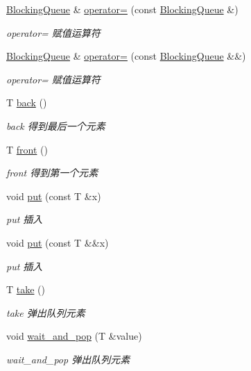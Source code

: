 \begin{DoxyCompactItemize}
\hyperlink{classBlockingQueue}{Blocking\+Queue} \& \hyperlink{classBlockingQueue_aaee07bb9044a01b4cb0af75748795325}{operator=} (const \hyperlink{classBlockingQueue}{Blocking\+Queue} \&)
\begin{DoxyCompactList}\small\item\em operator= 赋值运算符 \end{DoxyCompactList}\item 
\hyperlink{classBlockingQueue}{Blocking\+Queue} \& \hyperlink{classBlockingQueue_abbe4440d6ed06d175925bba1f3c02312}{operator=} (const \hyperlink{classBlockingQueue}{Blocking\+Queue} \&\&)
\begin{DoxyCompactList}\small\item\em operator= 赋值运算符 \end{DoxyCompactList}\item 
T \hyperlink{classBlockingQueue_a93c17143222334c4e4fe7035d4068bd0}{back} ()
\begin{DoxyCompactList}\small\item\em back 得到最后一个元素 \end{DoxyCompactList}\item 
T \hyperlink{classBlockingQueue_adc86e513ba273cfa07cf5293806df412}{front} ()
\begin{DoxyCompactList}\small\item\em front 得到第一个元素 \end{DoxyCompactList}\item 
void \hyperlink{classBlockingQueue_a1c824f8d644951d25bed9825794ddeae}{put} (const T \&x)
\begin{DoxyCompactList}\small\item\em put 插入 \end{DoxyCompactList}\item 
void \hyperlink{classBlockingQueue_acedd6887a4af752440fb2dcd04292fa3}{put} (const T \&\&x)
\begin{DoxyCompactList}\small\item\em put 插入 \end{DoxyCompactList}\item 
T \hyperlink{classBlockingQueue_aac788baea510940fc40961a285bacc5f}{take} ()
\begin{DoxyCompactList}\small\item\em take 弹出队列元素 \end{DoxyCompactList}\item 
void \hyperlink{classBlockingQueue_a8efc43c38666a38402c39f772da63fcf}{wait\+\_\+and\+\_\+pop} (T \&value)
\begin{DoxyCompactList}\small\item\em wait\+\_\+and\+\_\+pop 弹出队列元素 \end{DoxyCompactList}\item 

\end{DoxyCompactItemize}
